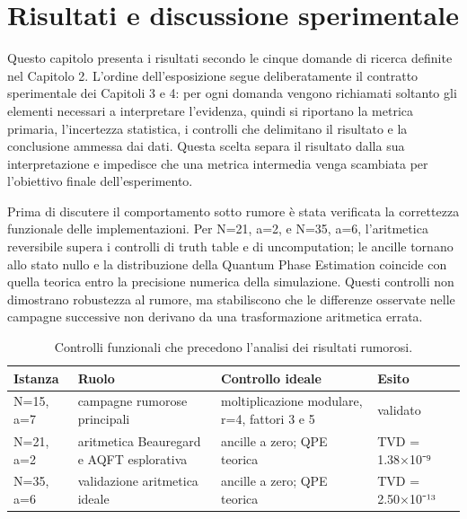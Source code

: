 \chapter{Risultati e discussione sperimentale}
\label{chap:risultati}
\label{chap:risultati1}
\label{chap:conclusioni1}
\label{chap:risultati2}
\label{chap:conclusioni2}
\label{chap:qec}
\label{chap:predizione}
\label{chap:surface}
\label{chap:integrazione}


Questo capitolo presenta i risultati secondo le cinque domande di ricerca definite nel Capitolo 2. L'ordine dell'esposizione segue deliberatamente il contratto sperimentale dei Capitoli 3 e 4: per ogni domanda vengono richiamati soltanto gli elementi necessari a interpretare l'evidenza, quindi si riportano la metrica primaria, l'incertezza statistica, i controlli che delimitano il risultato e la conclusione ammessa dai dati. Questa scelta separa il risultato dalla sua interpretazione e impedisce che una metrica intermedia venga scambiata per l'obiettivo finale dell'esperimento.

Prima di discutere il comportamento sotto rumore è stata verificata la correttezza funzionale delle implementazioni. Per N=21, a=2, e N=35, a=6, l'aritmetica reversibile supera i controlli di truth table e di uncomputation; le ancille tornano allo stato nullo e la distribuzione della Quantum Phase Estimation coincide con quella teorica entro la precisione numerica della simulazione. Questi controlli non dimostrano robustezza al rumore, ma stabiliscono che le differenze osservate nelle campagne successive non derivano da una trasformazione aritmetica errata.

\begingroup
\small
\begin{table}[!htbp]
\centering
\small

\begin{tabular}{@{}
  >{\raggedright\arraybackslash}p{}
  >{\raggedright\arraybackslash}p{}
  >{\raggedright\arraybackslash}p{}
  >{\raggedright\arraybackslash}p{}@{}}
\toprule
\textbf{Istanza} & \textbf{Ruolo} & \textbf{Controllo ideale} & \textbf{Esito} \\
\midrule
N=15, a=7 & campagne rumorose principali & moltiplicazione modulare, r=4, fattori 3 e 5 & validato \\
\addlinespace[0.3em]
N=21, a=2 & aritmetica Beauregard e AQFT esplorativa & ancille a zero; QPE teorica & TVD = 1.38×10⁻⁹ \\
\addlinespace[0.3em]
N=35, a=6 & validazione aritmetica ideale & ancille a zero; QPE teorica & TVD = 2.50×10⁻¹³ \\
\bottomrule
\end{tabular}
\caption{Controlli funzionali che precedono l'analisi dei risultati rumorosi.}\label{tab:finale_5_1}

\end{table}
\endgroup

